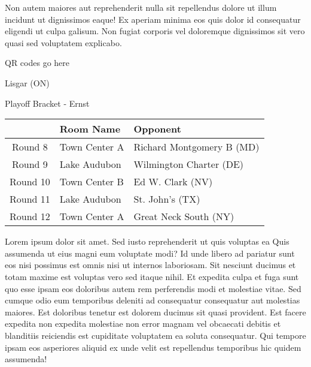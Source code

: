 \documentclass{article}%
\begin{document}
\newline%
Non autem maiores aut reprehenderit nulla sit repellendus dolore ut illum incidunt ut dignissimos eaque! Ex aperiam minima eos quis dolor id consequatur eligendi ut culpa galisum. Non fugiat corporis vel doloremque dignissimos sit vero quasi sed voluptatem explicabo.\newline%
\newline%
%
\vspace*{30pt}%
\begin{center}%
\begin{Huge}%
QR codes go here%
\end{Huge}%
\end{center}%
\newpage%
\begin{center}%
\begin{Huge}%
Lisgar (ON)%
\end{Huge}%
\vspace*{8pt}%
\linebreak%
\begin{Large}%
Playoff Bracket {-} Ernst%
\end{Large}%
\end{center}%
\begin{tabularx}{\textwidth}{|c|Y|Y|}%
\hline%
&Room Name&Opponent\\%
\hline%
Round 8&Town Center A&Richard Montgomery B (MD)\\%
Round 9&Lake Audubon&Wilmington Charter (DE)\\%
Round 10&Town Center B&Ed W. Clark (NV)\\%
Round 11&Lake Audubon&St. John's (TX)\\%
Round 12&Town Center A&Great Neck South (NY)\\%
\hline%
\end{tabularx}%
\vspace*{8pt}%
\linebreak%
\newline%
\newline%
Lorem ipsum dolor sit amet. Sed iusto reprehenderit ut quis voluptas ea Quis assumenda ut eius magni eum voluptate modi? Id unde libero ad pariatur sunt eos nisi possimus est omnis nisi ut internos laboriosam. Sit nesciunt ducimus et totam maxime est voluptas vero sed itaque nihil. Et expedita culpa et fuga sunt quo esse ipsam eos doloribus autem rem perferendis modi et molestiae vitae.\newline%
\newline%
Sed cumque odio eum temporibus deleniti ad consequatur consequatur aut molestias maiores. Est doloribus tenetur est dolorem ducimus sit quasi provident. Est facere expedita non expedita molestiae non error magnam vel obcaecati debitis et blanditiis reiciendis est cupiditate voluptatem ea soluta consequatur. Qui tempore ipsam eos asperiores aliquid ex unde velit est repellendus temporibus hic quidem assumenda!\newline%
\end{document}
